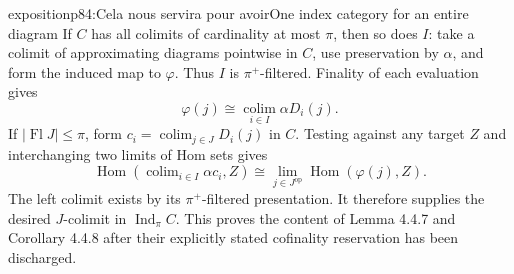 \begin{dcomment}{exposition}{p84:Cela nous servira pour avoir}{One index category for an entire diagram}
If $C$ has all colimits of cardinality at most $\pi$, then so does $I$: take a colimit of approximating diagrams pointwise in $C$, use preservation by $\alpha$, and form the induced map to $\varphi$.  Thus $I$ is $\pi^+$-filtered.  Finality of each evaluation gives
\[
 \varphi(j)\cong\operatorname*{colim}_{i\in I}\alpha D_i(j).
\]
If $|\operatorname{Fl}J|\leq\pi$, form $c_i=\operatorname{colim}_{j\in J}D_i(j)$ in $C$.  Testing against any target $Z$ and interchanging two limits of Hom sets gives
\[
 \operatorname{Hom}(\operatorname{colim}_{i\in I}\alpha c_i,Z)
 \cong\operatorname{lim}_{j\in J^{\mathrm{op}}}\operatorname{Hom}(\varphi(j),Z).
\]
The left colimit exists by its $\pi^+$-filtered presentation.  It therefore supplies the desired $J$-colimit in $\operatorname{Ind}_\pi C$.  This proves the content of Lemma 4.4.7 and Corollary 4.4.8 after their explicitly stated cofinality reservation has been discharged.
\end{dcomment}



